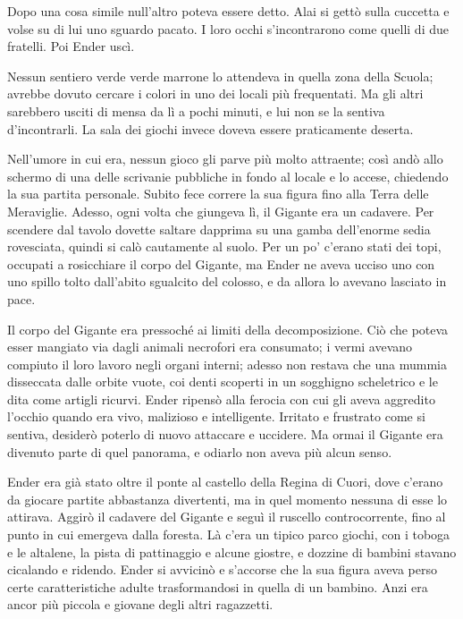 {Dopo una cosa simile null'altro poteva essere detto. Alai si gettò
	sulla cuccetta e volse su di lui uno sguardo pacato. I loro occhi
	s'incontrarono come quelli di due fratelli. Poi Ender uscì.}

{Nessun sentiero verde verde marrone lo attendeva in quella zona della
	Scuola; avrebbe dovuto cercare i colori in uno dei locali più
	frequentati. Ma gli altri sarebbero usciti di mensa da lì a pochi
	minuti, e lui non se la sentiva d'incontrarli. La sala dei giochi invece
	doveva essere praticamente deserta.}

{Nell'umore in cui era, nessun gioco gli parve più molto attraente; così
	andò allo schermo di una delle scrivanie pubbliche in fondo al locale e
	lo accese, chiedendo la sua partita personale. Subito fece correre la
	sua figura fino alla Terra delle Meraviglie. Adesso, ogni volta che
	giungeva lì, il Gigante era un cadavere. Per scendere dal tavolo dovette
	saltare dapprima su una gamba dell'enorme sedia rovesciata, quindi si
	calò cautamente al suolo. Per un po' c'erano stati dei topi, occupati a
	rosicchiare il corpo del Gigante, ma Ender ne aveva ucciso uno con uno
	spillo tolto dall'abito sgualcito del colosso, e da allora lo avevano
	lasciato in pace.}

{Il corpo del Gigante era pressoché ai limiti della decomposizione. Ciò
	che poteva esser mangiato via dagli animali necrofori era consumato; i
	vermi avevano compiuto il loro lavoro negli organi interni; adesso non
	restava che una mummia disseccata dalle orbite vuote, coi denti scoperti
	in un sogghigno scheletrico e le dita come artigli ricurvi. Ender
	ripensò alla ferocia con cui gli aveva aggredito l'occhio quando era
	vivo, malizioso e intelligente. Irritato e frustrato come si sentiva,
	desiderò poterlo di nuovo attaccare e uccidere. Ma ormai il Gigante era
	divenuto parte di quel panorama, e odiarlo non aveva più alcun senso.}

{Ender era già stato oltre il ponte al castello della Regina di Cuori,
	dove c'erano da giocare partite abbastanza divertenti, ma in quel
	momento nessuna di esse lo attirava. Aggirò il cadavere del Gigante e
	seguì il ruscello controcorrente, fino al punto in cui emergeva dalla
	foresta. Là c'era un tipico parco giochi, con i toboga e le altalene, la
	pista di pattinaggio e alcune giostre, e dozzine di bambini stavano
	cicalando e ridendo. Ender si avvicinò e s'accorse che la sua figura
	aveva perso certe caratteristiche adulte trasformandosi in quella di un
	bambino. Anzi era ancor più piccola e giovane degli altri ragazzetti.}


